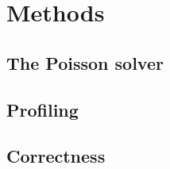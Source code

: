\section{Methods}

\subsection{The Poisson solver}

\subsection{Profiling}

\subsection{Correctness}

\subsection{}